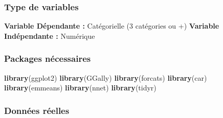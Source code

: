 \documentclass[
]{book}
\newenvironment{Shaded}{\begin{snugshade}}{\end{snugshade}}
\newcommand{\KeywordTok}[1]{\textcolor[rgb]{0.13,0.29,0.53}{\textbf{#1}}}
\newcommand{\NormalTok}[1]{#1}
\begin{document}
\hypertarget{type-de-variables-13}{%
\subsubsection{Type de variables}\label{type-de-variables-13}}

\textbf{Variable Dépendante :} Catégorielle (3 catégories ou +)
\textbf{Variable Indépendante :} Numérique

\hypertarget{packages-nuxe9cessaires-13}{%
\subsubsection{Packages nécessaires}\label{packages-nuxe9cessaires-13}}

\begin{Shaded}
\begin{Highlighting}[]
\KeywordTok{library}\NormalTok{(ggplot2)}
\KeywordTok{library}\NormalTok{(GGally)}
\KeywordTok{library}\NormalTok{(forcats)}
\KeywordTok{library}\NormalTok{(car)}
\KeywordTok{library}\NormalTok{(emmeans)}
\KeywordTok{library}\NormalTok{(nnet)}
\KeywordTok{library}\NormalTok{(tidyr)}
\end{Highlighting}
\end{Shaded}

\hypertarget{donnuxe9es-ruxe9elles-13}{%
\subsubsection{Données réelles}\label{donnuxe9es-ruxe9elles-13}}
\end{document}

